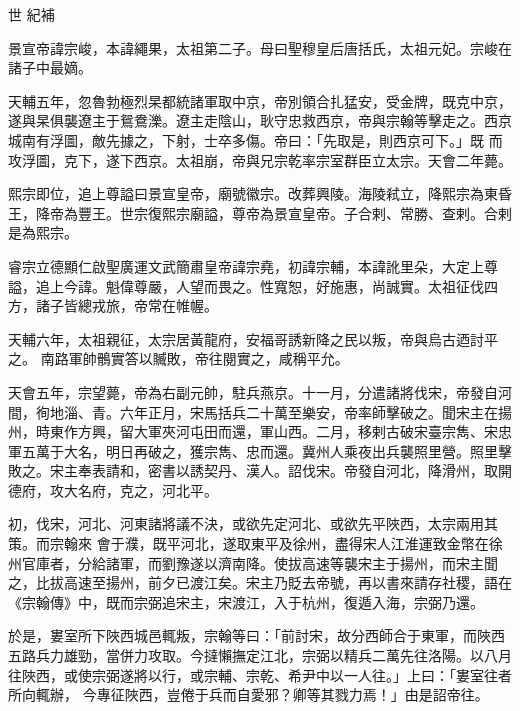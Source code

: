 
\begin{pinyinscope}

 世
 紀補



 景宣帝諱宗峻，本諱繩果，太祖第二子。母曰聖穆皇后唐括氏，太祖元妃。宗峻在諸子中最嫡。



 天輔五年，忽魯勃極烈杲都統諸軍取中京，帝別領合扎猛安，受金牌，既克中京，遂與杲俱襲遼主于鴛鴦濼。遼主走陰山，耿守忠救西京，帝與宗翰等擊走之。西京城南有浮圖，敵先據之，下射，士卒多傷。帝曰：「先取是，則西京可下。」既
 而攻浮圖，克下，遂下西京。太祖崩，帝與兄宗乾率宗室群臣立太宗。天會二年薨。



 熙宗即位，追上尊謚曰景宣皇帝，廟號徽宗。改葬興陵。海陵弒立，降熙宗為東昏王，降帝為豐王。世宗復熙宗廟謚，尊帝為景宣皇帝。子合剌、常勝、查剌。合剌是為熙宗。



 睿宗立德顯仁啟聖廣運文武簡肅皇帝諱宗堯，初諱宗輔，本諱訛里朵，大定上尊謚，追上今諱。魁偉尊嚴，人望而畏之。性寬恕，好施惠，尚誠實。太祖征伐四方，諸子皆總戎旅，帝常在帷幄。



 天輔六年，太祖親征，太宗居黃龍府，安福哥誘新降之民以叛，帝與烏古迺討平之。
 南路軍帥鶻實答以贓敗，帝往閱實之，咸稱平允。



 天會五年，宗望薨，帝為右副元帥，駐兵燕京。十一月，分遣諸將伐宋，帝發自河間，徇地淄、青。六年正月，宋馬括兵二十萬至樂安，帝率師擊破之。聞宋主在揚州，時東作方興，留大軍夾河屯田而還，軍山西。二月，移剌古破宋臺宗雋、宋忠軍五萬于大名，明日再破之，獲宗雋、忠而還。冀州人乘夜出兵襲照里營。照里擊敗之。宋主奉表請和，密書以誘契丹、漢人。詔伐宋。帝發自河北，降滑州，取開德府，攻大名府，克之，河北平。



 初，伐宋，河北、河東諸將議不決，或欲先定河北、或欲先平陜西，太宗兩用其策。而宗翰來
 會于濮，既平河北，遂取東平及徐州，盡得宋人江淮運致金幣在徐州官庫者，分給諸軍，而劉豫遂以濟南降。使拔高速等襲宋主于揚州，而宋主聞之，比拔高速至揚州，前夕已渡江矣。宋主乃貶去帝號，再以書來請存社稷，語在《宗翰傳》中，既而宗弼追宋主，宋渡江，入于杭州，復遁入海，宗弼乃還。



 於是，婁室所下陜西城邑輒叛，宗翰等曰：「前討宋，故分西師合于東軍，而陜西五路兵力雄勁，當併力攻取。今撻懶撫定江北，宗弼以精兵二萬先往洛陽。以八月往陜西，或使宗弼遂將以行，或宗輔、宗乾、希尹中以一人往。」上曰：「婁室往者所向輒辦，
 今專征陜西，豈倦于兵而自愛邪？卿等其戮力焉！」由是詔帝往。




\end{pinyinscope}
